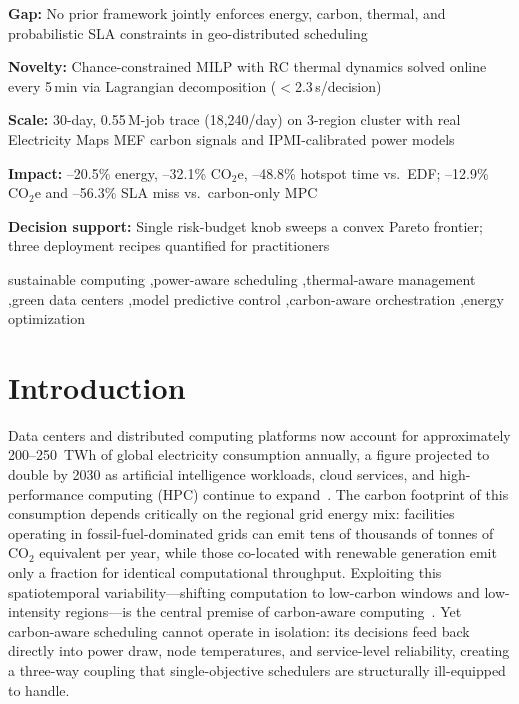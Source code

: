 \documentclass[a4paper,fleqn]{cas-dc}
\begin{document}
\begin{highlights}
\item \textbf{Gap:} No prior framework jointly enforces energy, carbon, thermal, and probabilistic SLA constraints in geo-distributed scheduling
\item \textbf{Novelty:} Chance-constrained MILP with RC thermal dynamics solved online every 5\,min via Lagrangian decomposition ($<$2.3\,s/decision)
\item \textbf{Scale:} 30-day, 0.55\,M-job trace (18,240/day) on 3-region cluster with real Electricity Maps MEF carbon signals and IPMI-calibrated power models
\item \textbf{Impact:} --20.5\% energy, --32.1\% CO$_2$e, --48.8\% hotspot time vs.\ EDF; --12.9\% CO$_2$e and --56.3\% SLA miss vs.\ carbon-only MPC
\item \textbf{Decision support:} Single risk-budget knob sweeps a convex Pareto frontier; three deployment recipes quantified for practitioners
\end{highlights}

\begin{keywords}
sustainable computing \sep power-aware scheduling \sep thermal-aware management \sep green data centers \sep model predictive control \sep carbon-aware orchestration \sep energy optimization
\end{keywords}

\begingroup
\hypersetup{pageanchor=false}%
\setlength{\emergencystretch}{2em}
\sloppy
\maketitle
\endgroup
\hypersetup{pageanchor=true}

\section{Introduction}
\label{sec:intro}

Data centers and distributed computing platforms now account for approximately 200--250~TWh of global electricity consumption annually, a figure projected to double by 2030 as artificial intelligence workloads, cloud services, and high-performance computing (HPC) continue to expand~\cite{ref-mishra23,ref-radovanovic21,ref-peltonen25,ref-nesterovich25}. The carbon footprint of this consumption depends critically on the regional grid energy mix: facilities operating in fossil-fuel-dominated grids can emit tens of thousands of tonnes of CO$_{2}$ equivalent per year, while those co-located with renewable generation emit only a fraction for identical computational throughput. Exploiting this spatiotemporal variability---shifting computation to low-carbon windows and low-intensity regions---is the central premise of carbon-aware computing~\cite{ref-radovanovic21,ref-le15,ref-asadov25,ref-paul23review,ref-lin24review,ref-zakarya24review}. Yet carbon-aware scheduling cannot operate in isolation: its decisions feed back directly into power draw, node temperatures, and service-level reliability, creating a three-way coupling that single-objective schedulers are structurally ill-equipped to handle.
\end{document}
